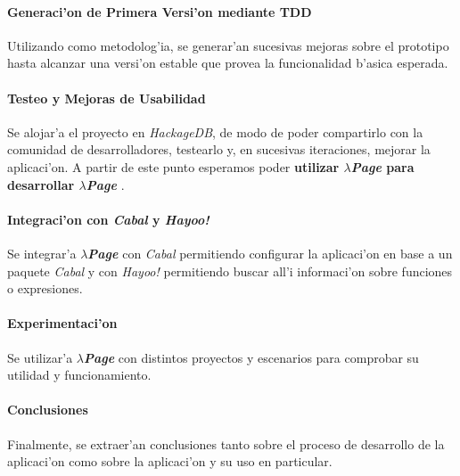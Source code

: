 \documentclass[a4paper]{article}
\newcommand{\hpage}{\textbf{\textsl{$\lambda$Page}} }
\begin{document}
\paragraph{Generaci'on de Primera Versi'on mediante TDD} Utilizando  como metodolog'ia, se generar'an sucesivas mejoras sobre el prototipo hasta alcanzar una versi'on estable que provea la funcionalidad b'asica esperada.
\paragraph{Testeo y Mejoras de Usabilidad} Se alojar'a el proyecto en \textsl{HackageDB}, de modo de poder compartirlo con la comunidad de desarrolladores, testearlo y, en sucesivas iteraciones, mejorar la aplicaci'on.  A partir de este punto esperamos poder \textbf{utilizar \hpage para desarrollar \hpage}.
\paragraph{Integraci'on con \textsl{Cabal} y \textsl{Hayoo!}} Se integrar'a \hpage con \textsl{Cabal} permitiendo configurar la aplicaci'on en base a un paquete \textsl{Cabal} y con \textsl{Hayoo!} permitiendo buscar all'i informaci'on sobre funciones o expresiones.
\paragraph{Experimentaci'on} Se utilizar'a \hpage con distintos proyectos y escenarios para comprobar su utilidad y funcionamiento.
\paragraph{Conclusiones} Finalmente, se extraer'an conclusiones tanto sobre el proceso de desarrollo de la aplicaci'on como sobre la aplicaci'on y su uso en particular.


\end{document}
